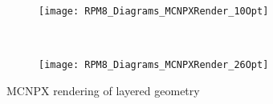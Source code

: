 \documentclass[compress]{beamer}
\begin{document}
\begin{frame}
\begin{figure}
    \centering
    \begin{subfigure}[b]{0.45\textwidth}
        \texttt{[image: RPM8\_Diagrams\_MCNPXRender\_10Opt]}
    \end{subfigure}%
    ~
    \begin{subfigure}[b]{0.45\textwidth}
        \texttt{[image: RPM8\_Diagrams\_MCNPXRender\_26Opt]}
    \end{subfigure}
    \caption{MCNPX rendering of layered geometry}
    \label{fig:MCNPXRendering}
\end{figure}
\end{frame}
\end{document}

